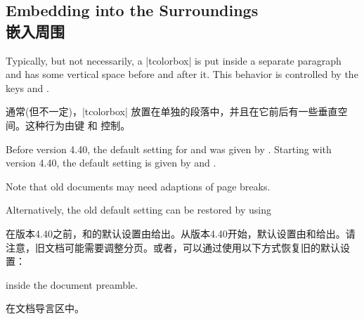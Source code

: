 \setcounter{section}{4}
\setcounter{subsection}{13}
\setcounter{subsubsection}{0}%

\subsection{Embedding into the Surroundings\\嵌入周围}\label{subsec:surroundings}

Typically, but not necessarily, a |tcolorbox| is put inside a separate paragraph and has some vertical space before and after it.
This behavior is controlled by the keys  and .

通常(但不一定)，|tcolorbox| 放置在单独的段落中，并且在它前后有一些垂直空间。这种行为由键  和  控制。


\begin{marker}
Before version 4.40, the default setting for 
and  was given by .
Starting with version 4.40, the default setting is given by
 and .\par
Note that old documents may need adaptions of page breaks.\par
Alternatively, the old default setting can be restored by using


在版本4.40之前，和的默认设置由给出。从版本4.40开始，默认设置由和给出。请注意，旧文档可能需要调整分页。或者，可以通过使用以下方式恢复旧的默认设置：
\begin{dispListing}
\end{dispListing}
inside the document preamble.

在文档导言区中。
\end{marker}

